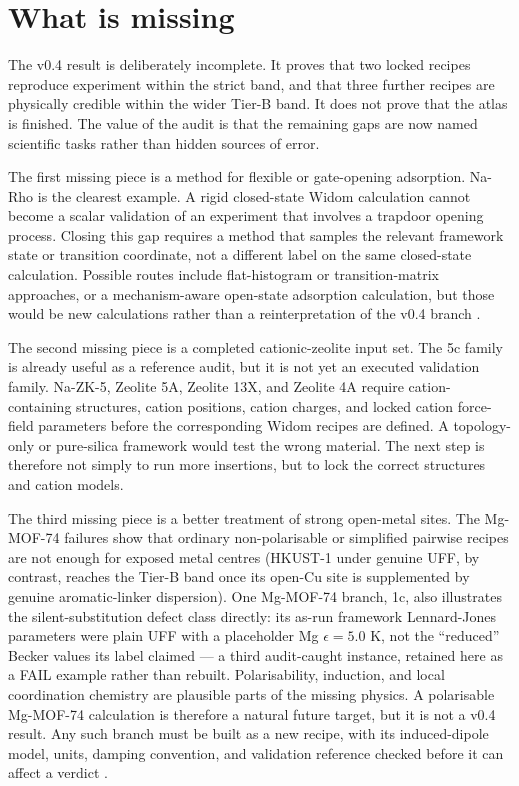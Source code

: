 \section{What is missing}\label{sec:missing}

The v0.4 result is deliberately incomplete. It proves that two locked recipes reproduce experiment within the strict band, and that three further recipes are physically credible within the wider Tier-B band. It does not prove that the atlas is finished. The value of the audit is that the remaining gaps are now named scientific tasks rather than hidden sources of error.

The first missing piece is a method for flexible or gate-opening adsorption. Na-Rho is the clearest example. A rigid closed-state Widom calculation cannot become a scalar validation of an experiment that involves a trapdoor opening process. Closing this gap requires a method that samples the relevant framework state or transition coordinate, not a different label on the same closed-state calculation. Possible routes include flat-histogram or transition-matrix approaches, or a mechanism-aware open-state adsorption calculation, but those would be new calculations rather than a reinterpretation of the v0.4 branch \cite{Witman2018JCTC}.

The second missing piece is a completed cationic-zeolite input set. The 5c family is already useful as a reference audit, but it is not yet an executed validation family. Na-ZK-5, Zeolite 5A, Zeolite 13X, and Zeolite 4A require cation-containing structures, cation positions, cation charges, and locked cation force-field parameters before the corresponding Widom recipes are defined. A topology-only or pure-silica framework would test the wrong material. The next step is therefore not simply to run more insertions, but to lock the correct structures and cation models.

The third missing piece is a better treatment of strong open-metal sites. The Mg-MOF-74 failures show that ordinary non-polarisable or simplified pairwise recipes are not enough for exposed metal centres (HKUST-1 under genuine UFF, by contrast, reaches the Tier-B band once its open-Cu site is supplemented by genuine aromatic-linker dispersion). One Mg-MOF-74 branch, 1c, also illustrates the silent-substitution defect class directly: its as-run framework Lennard-Jones parameters were plain UFF with a placeholder Mg \(\epsilon = 5.0\) K, not the ``reduced'' Becker values its label claimed --- a third audit-caught instance, retained here as a FAIL example rather than rebuilt. Polarisability, induction, and local coordination chemistry are plausible parts of the missing physics. A polarisable Mg-MOF-74 calculation is therefore a natural future target, but it is not a v0.4 result. Any such branch must be built as a new recipe, with its induced-dipole model, units, damping convention, and validation reference checked before it can affect a verdict \cite{Becker2018JPCC}.

